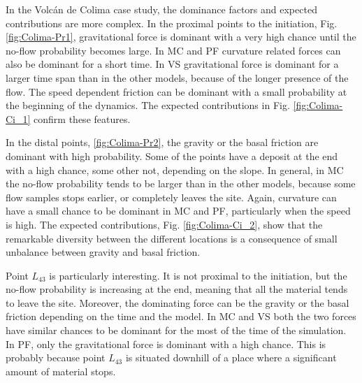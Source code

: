 \documentclass{article}
\begin{document}
In the Volc\'an de Colima case study, the dominance factors and expected contributions are more complex. In the proximal points to the initiation, Fig. \ref{fig:Colima-Pr1}, gravitational force is dominant with a very high chance until the no-flow probability becomes large. In MC and PF curvature related forces can also be dominant for a short time. In VS gravitational force is dominant for a larger time span than in the other models, because of the longer presence of the flow. The speed dependent friction can be dominant with a small probability at the beginning of the dynamics. The expected contributions in Fig. \ref{fig:Colima-Ci_1} confirm these features.

In the distal points, \ref{fig:Colima-Pr2}, the gravity or the basal friction are dominant with high probability. Some of the points have a deposit at the end with a high chance, some other not, depending on the slope. In general, in MC the no-flow probability tends to be larger than in the other models, because some flow samples stops earlier, or completely leaves the site. Again, curvature can have a small chance to be dominant in MC and PF, particularly when the speed is high. The expected contributions, Fig. \ref{fig:Colima-Ci_2}, show that the remarkable diversity between the different locations is a consequence of small unbalance between gravity and basal friction.

Point $L_{43}$ is particularly interesting. It is not proximal to the initiation, but the no-flow probability is increasing at the end, meaning that all the material tends to leave the site. Moreover, the dominating force can be the gravity or the basal friction depending on the time and the model. In MC and VS both the two forces have similar chances to be dominant for the most of the time of the simulation. In PF, only the gravitational force is dominant with a high chance. This is probably because point $L_{43}$ is situated downhill of a place where a significant amount of material stops.
\end{document}
